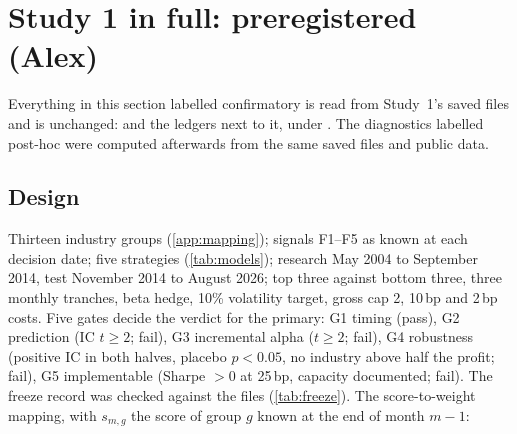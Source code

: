 \section{Study 1 in full: preregistered (Alex)}\label{app:study1}\label{app:results}
Everything in this section labelled confirmatory is read from Study~1's saved files and is unchanged:  and the ledgers next to it, under . The diagnostics labelled post-hoc were computed afterwards from the same saved files and public data.

\subsection*{Design}
Thirteen industry groups (\cref{app:mapping}); signals F1--F5 as known at each decision date; five strategies (\cref{tab:models}); research May 2004 to September 2014, test November 2014 to August 2026; top three against bottom three, three monthly tranches, beta hedge, 10\% volatility target, gross cap 2, 10\,bp and 2\,bp costs. Five gates decide the verdict for the primary: G1 timing (pass), G2 prediction (IC $t\ge2$; fail), G3 incremental alpha ($t\ge2$; fail), G4 robustness (positive IC in both halves, placebo $p<0.05$, no industry above half the profit; fail), G5 implementable (Sharpe $>0$ at 25\,bp, capacity documented; fail). %
The freeze record was checked against the files (\cref{tab:freeze}). %
The score-to-weight mapping, with $s_{m,g}$ the score of group $g$ known at the end of month $m-1$:


